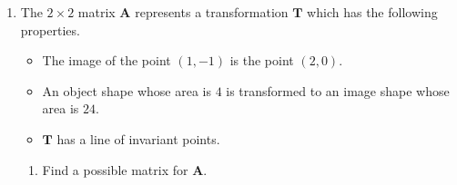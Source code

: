 \documentclass[leqno]{article}
\newcommand{\questionitem}{%
  \item\phantomsection
  \addcontentsline{toc}{section}{Question \number\value{enumi}}%
}
\begin{document}
\begin{enumerate}[
  label=\textbf{\arabic*.},
  leftmargin=*,
  topsep=0pt,
  partopsep=0pt,
  parsep=0pt
]
\begin{tcolorbox}[colback=white, colframe=scarlet, title={\textbf{Solution}}, breakable, grow to left by=6mm, grow to right by=10mm]
\begin{enumerate}[label=\textbf{(\alph*)}]
  So its coordinates must satisfy
  \[
  px=m\bigl((2-m)x\bigr)
  \]
  Hence
  \[
  px=(2m-m^2)x
  \]
  so
  \[
  p=2m-m^2
  \]
  Rearranging,
  \[
  m^2-2m+p=0
  \]
  as required.

  The transformation has no invariant lines through the origin when this quadratic has no real solutions for $m$.

  Its discriminant is
  \[
  (-2)^2-4(1)(p)=4-4p
  \]
  For no real roots,
  \[
  4-4p<0
  \]
  \[
  1-p<0
  \]
  \[
  p>1
  \]

  Therefore the transformation has no invariant lines through the origin when $p>1$.

  \item The matrix of the transformation is
  \[
  \mathbf{M}=\begin{pmatrix}2&-1\\ p&0\end{pmatrix}
  \]
  Its determinant is
  \[
  \det(\mathbf{M})=2\cdot 0-(-1)(p)=p
  \]

  The transformation multiplies areas by $3$ and reverses orientation, so
  \[
  \det(\mathbf{M})=-3
  \]
  Hence
  \[
  p=-3
  \]

  Substitute this into the invariant-line condition from part (a):
  \[
  m^2-2m+p=0
  \]
  \[
  m^2-2m-3=0
  \]
  Factorising,
  \[
  (m-3)(m+1)=0
  \]
  So
  \[
  m=3 \quad \text{or} \quad m=-1
  \]

  Therefore the invariant lines are
  \[
  y=3x \quad \text{and} \quad y=-x
  \]
\end{enumerate}
\end{tcolorbox}


\newpage

\questionitem

The $2 \times 2$ matrix $\mathbf{A}$ represents a transformation $\mathbf{T}$ which has the following properties. \\

\begin{itemize}
\item The image of the point $(1,-1)$ is the point $(2,0)$.
\item An object shape whose area is $4$ is transformed to an image shape whose area is $24$.
\item $\mathbf{T}$ has a line of invariant points. \\
\end{itemize}

\begin{enumerate}[label=(\roman*)]
  \item Find a possible matrix for $\mathbf{A}$.  \\
\end{enumerate}


\end{enumerate}
\end{document}
